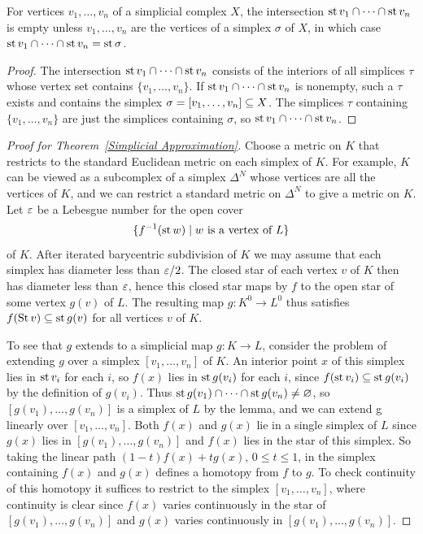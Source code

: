 \begin{lemma}
For vertices $v_1,\dots,v_n$ of a simplicial complex $X$, the intersection $\mathrm{st}\, v_1\cap\cdots\cap\mathrm{st}\, v_n$ is empty unless $v_1,\dots,v_n$ are the vertices of a simplex $\sigma$ of $X$, in which case $\mathrm{st}\, v_1\cap\cdots\cap\mathrm{st}\, v_n=\mathrm{st}\,\sigma$.
\end{lemma}
\begin{proof}
The intersection $\mathrm{st}\, v_1\cap\cdots\cap\mathrm{st}\, v_n$ consists of the interiors of all simplices $\tau$ whose vertex set contains $\{v_1,\dots,v_n\}$. If $\mathrm{st}\, v_1\cap\cdots\cap\mathrm{st}\, v_n$ is nonempty, such a $\tau$ exists and contains the simplex $\sigma=[v_1,\dots,v_n]\subseteq X$. The simplices $\tau$ containing
$\{v_1,\dots,v_n\}$ are just the simplices containing $\sigma$, so $\mathrm{st}\, v_1\cap\cdots\cap\mathrm{st}\, v_n$.
\end{proof}
\begin{proof}[Proof for Theorem~\ref{Simplicial Approximation}]
Choose a metric on $K$ that restricts to the standard Euclidean metric on each simplex of $K$. For example, $K$ can be viewed as a subcomplex of a simplex $\Delta^N$ whose vertices are all the vertices of $K$, and we can restrict a standard metric on $\Delta^N$ to give a metric on $K$. Let $\varepsilon$ be a Lebesgue number for the open cover
\[\{f^{-1}(\mathrm{st}\, w)\mid w\text{ is a vertex of }L\}\] 
of $K$. After iterated barycentric subdivision of $K$ we may assume that each simplex has diameter less than $\varepsilon/2$. The closed star of each vertex $v$ of $K$ then has diameter less than $\varepsilon$, hence this closed star maps by $f$ to
the open star of some vertex $g(v)$ of $L$. The resulting map $g:K^0\to L^0$ thus satisfies $f(\mathrm{St}\, v)\subseteq\mathrm{st}\, g(v)$ for all vertices $v$ of $K$.\par
To see that $g$ extends to a simplicial map $g:K\to L$, consider the problem of
extending $g$ over a simplex $[v_1,\dots,v_n]$ of $K$. An interior point $x$ of this simplex lies in $\mathrm{st}\, v_i$ for each $i$, so $f(x)$ lies in $\mathrm{st}\, g(v_i)$ for each $i$, since $f(\mathrm{st}\, v_i)\subseteq\mathrm{st}\, g(v_i)$ by the definition of $g(v_i)$. Thus $\mathrm{st}\, g(v_1)\cap\cdots\cap\mathrm{st}\, g(v_n)\neq\varnothing$, so $[g(v_1),\dots,g(v_n)]$ is a simplex of $L$ by the lemma, and we can extend g linearly over $[v_1,\dots,v_n]$. Both $f(x)$ and $g(x)$ lie in a single simplex of $L$ since $g(x)$ lies in $[g(v_1),\dots,g(v_n)]$ and $f(x)$ lies in the star of this simplex. So taking the linear path $(1-t)f(x)+tg(x)$, $0\leq t\leq 1$, in the simplex containing $f(x)$ and $g(x)$ defines a homotopy from $f$ to $g$. To check continuity of this homotopy it suffices to restrict to the simplex $[v_1,\dots,v_n]$, where continuity is clear since $f(x)$ varies continuously in the star of $[g(v_1),\dots,g(v_n)]$ and $g(x)$ varies continuously in $[g(v_1),\dots,g(v_n)]$.
\end{proof}
